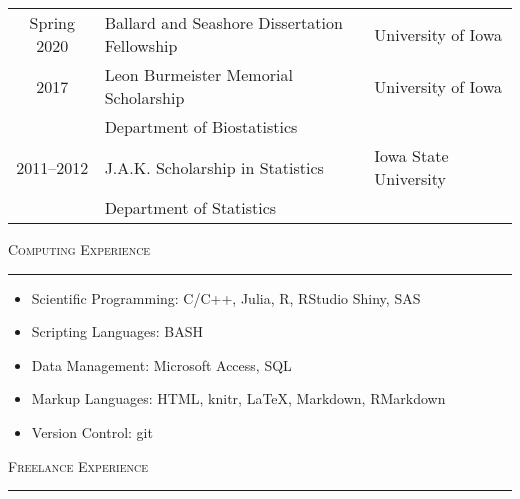 \documentclass[a4paper]{article}
\begin{document}
\begin{tabular*}{0.9\textwidth}{@{\extracolsep{\fill}}cll}
  Spring 2020 & Ballard and Seashore Dissertation Fellowship & University of Iowa \\[3pt]
  2017 & Leon Burmeister Memorial Scholarship & University of Iowa \\
       & Department of Biostatistics & \\[3pt]
  2011--2012 & J.A.K. Scholarship in Statistics & Iowa State University \\
            & Department of Statistics
\end{tabular*}
\vspace{0.25\baselineskip}


\begin{flushleft}
  \Large\textsc{Computing Experience}
  \textcolor{usafagrey}{\rule[0.5\baselineskip]{\textwidth}{0.75pt}}
\end{flushleft}
\vspace{-1.5\baselineskip}

\begin{itemize}
  \item Scientific Programming: C/C++, Julia, R, RStudio Shiny, SAS
  \item Scripting Languages: BASH
  \item Data Management: Microsoft Access, SQL
  \item Markup Languages: HTML, knitr, \LaTeX, Markdown, RMarkdown
  \item Version Control: git
\end{itemize}


\begin{flushleft}
  \Large\textsc{Freelance Experience}
  \textcolor{usafagrey}{\rule[0.5\baselineskip]{\textwidth}{0.75pt}}
\end{flushleft}
\vspace{-1.5\baselineskip}
\end{document}
